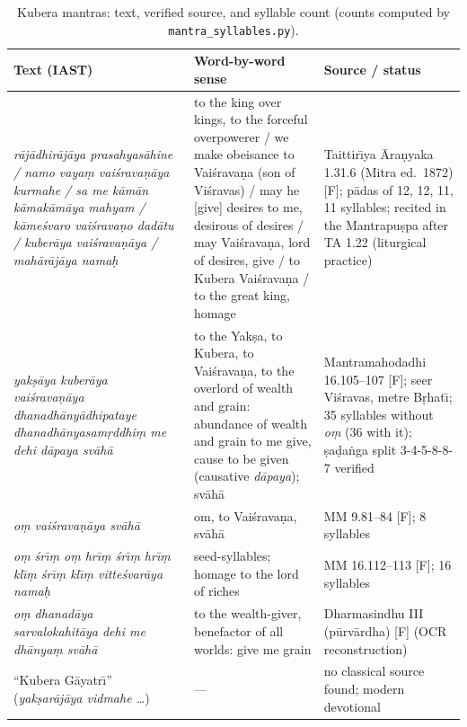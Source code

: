 \documentclass[pdflatex,sn-basic]{sn-jnl}
\theoremstyle{thmstyleone}
\theoremstyle{thmstylethree}
\newcommand{\Fact}{\textsf{[F]}}
\begin{document}
\begin{table}[t]
\caption{Kubera mantras: text, verified source, and syllable count (counts computed by \texttt{mantra\_syllables.py}).}
\label{tab:mantras}
\centering\small
\begin{tabular}{@{}>{\raggedright\arraybackslash}p{}>{\raggedright\arraybackslash}p{}>{\raggedright\arraybackslash}p{}@{}}
\toprule
Text (IAST) & Word-by-word sense & Source / status \\
\midrule
\emph{r\=aj\=adhir\=aj\=aya prasahyas\=ahine / namo vaya\d m vai\'srava\d n\=aya kurmahe / sa me k\=am\=an k\=amak\=am\=aya mahyam / k\=ame\'svaro vai\'srava\d no dad\=atu / kuber\=aya vai\'srava\d n\=aya / mah\=ar\=aj\=aya nama\d h}
& to the king over kings, to the forceful overpowerer / we make obeisance to Vai\'srava\d na (son of Vi\'sravas) / may he [give] desires to me, desirous of desires / may Vai\'srava\d na, lord of desires, give / to Kubera Vai\'srava\d na / to the great king, homage
& Taittir\=\i ya \=Ara\d nyaka 1.31.6 (Mitra ed.\ 1872) \Fact; p\=adas of 12, 12, 11, 11 syllables; recited in the Mantrapu\d spa after TA 1.22 (liturgical practice) \\
\midrule
\emph{yak\d s\=aya kuber\=aya vai\'srava\d n\=aya dhanadh\=any\=adhipataye dhanadh\=anyasam\d rddhi\d m me dehi d\=apaya sv\=ah\=a}
& to the Yak\d sa, to Kubera, to Vai\'srava\d na, to the overlord of wealth and grain: abundance of wealth and grain to me give, cause to be given (causative \emph{d\=apaya}); sv\=ah\=a
& Mantramahodadhi 16.105--107 \Fact; seer Vi\'sravas, metre B\d rhat\=\i; 35 syllables without \emph{o\d m} (36 with it); \d sa\d da\.nga split 3-4-5-8-8-7 verified \\
\midrule
\emph{o\d m vai\'srava\d n\=aya sv\=ah\=a} & om, to Vai\'srava\d na, sv\=ah\=a & MM 9.81--84 \Fact; 8 syllables \\
\emph{o\d m \'sr\=\i\d m o\d m hr\=\i\d m \'sr\=\i\d m hr\=\i\d m kl\=\i\d m \'sr\=\i\d m kl\=\i\d m vitte\'svar\=aya nama\d h} & seed-syllables; homage to the lord of riches & MM 16.112--113 \Fact; 16 syllables \\
\emph{o\d m dhanad\=aya sarvalokahit\=aya dehi me dh\=anya\d m sv\=ah\=a} & to the wealth-giver, benefactor of all worlds: give me grain & Dharmasindhu III (p\=urv\=ardha) \Fact{} (OCR reconstruction) \\
``Kubera G\=ayatr\=\i'' (\emph{yak\d sar\=aj\=aya vidmahe \dots}) & --- & no classical source found; modern devotional \\
\bottomrule
\end{tabular}
\end{table}
\end{document}
